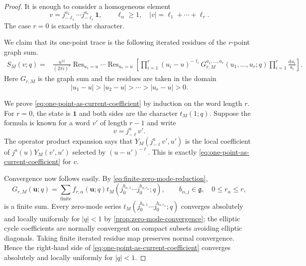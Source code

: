 \documentclass[11pt,a4paper]{amsart}
\numberwithin{equation}{section}
\theoremstyle{definition}
\theoremstyle{remark}
\DeclareMathOperator*{\Res}{Res}
\newcommand{\g}{\mathfrak g}
\newcommand{\one}{\mathbf 1}
\newcommand{\dd}{\mathrm d}
\newcommand{\ubf}{\boldsymbol u}
\begin{document}
\begin{proof}
It is enough to consider a homogeneous element
\begin{equation}
 v=j_{-\ell_1}^{a_1}\cdots j_{-\ell_r}^{a_r}\one,
 \qquad
 \ell_\alpha\geq1, \quad
 |v|=\ell_1+\cdots+\ell_r.
 \label{eq:zhu-section-pbw-word}
\end{equation}
The case $r=0$ is exactly the character.

We claim that its one-point trace is the following iterated residues of the $r$-point graph sum.
\begin{align}
 S_M(v;q)
 = & \frac{u^{|v|}}{(2\pi i)^r}
 \Res_{u_1=u}\cdots\Res_{u_r=u}
 \left[
  \prod_{i=1}^{r}
  (u_i-u)^{-\ell_i}
   G_{r,M}^{a_1,\ldots,a_r}
  (u_1,\ldots,u_r;q)
 \prod_{i=1}^{r}\frac{\dd u_i}{u_i}\right].
 \label{eq:one-point-as-current-coefficient}
\end{align}
Here $G_{r,M}$ is the graph sum and the residues are taken in the domain
\begin{equation*}
 |u_1-u|>|u_2-u|>\cdots> |u_r-u|>0.
\end{equation*}

We prove \eqref{eq:one-point-as-current-coefficient} by induction on the word length $r$.  For $r=0$, the state is $\one$ and both sides are the character $t_M(1;q)$.  Suppose the formula is known for a word $v'$ of length $r-1$ and write
\begin{equation*}
 v=j_{-\ell}^{a}v'.
\end{equation*}
The operator product expansion says that $Y_M(j_{-\ell}^{a}v',u')$ is the local coefficient of $j^a(u)Y_M(v',u')$ selected by $(u-u')^{-\ell}$.  This is exactly \eqref{eq:one-point-as-current-coefficient} for $v$. 

Convergence now follows easily.  By \eqref{eq:finite-zero-mode-reduction},
\begin{equation*}
 G_{r,M}(\ubf;q)
 =\sum_{\text{finite}}
 f_{r,\alpha}(\ubf;q)t_M(j_0^{b_{\alpha,1}}\cdots j_0^{b_{\alpha,r_\alpha}};q),
 \qquad b_{\alpha,j}\in\g,\quad 0\leq r_\alpha\leq r,
\end{equation*}
is a finite sum.  Every zero-mode series $t_M(j_0^{b_{\alpha,1}}\cdots j_0^{b_{\alpha,r_\alpha}};q)$ converges absolutely and locally uniformly for $|q|<1$ by \cref{prop:zero-mode-convergence}; the elliptic cycle coefficients are normally convergent on compact subsets avoiding elliptic diagonals. Taking finite iterated residue map preserves normal convergence.  Hence the right-hand side of \eqref{eq:one-point-as-current-coefficient} converges absolutely and locally uniformly for $|q|<1$.
\end{proof}
\end{document}
